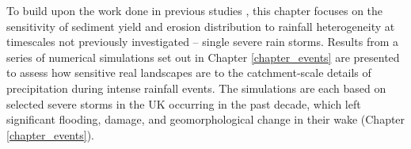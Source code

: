 %

To build upon the work done in previous studies \citep[e.g.][]{han2015measuring, coulthard2016sensitivity}, this chapter focuses on the sensitivity of sediment yield and erosion distribution to rainfall heterogeneity at timescales not previously investigated -- single severe rain storms. 
Results from a series of numerical simulations set out in Chapter \ref{chapter_events} are presented to assess how sensitive real landscapes are to the catchment-scale details of precipitation during intense rainfall events. The simulations are each based on selected severe storms in the UK occurring in the past decade, which left significant flooding, damage, and geomorphological change in their wake (Chapter \ref{chapter_events}).

